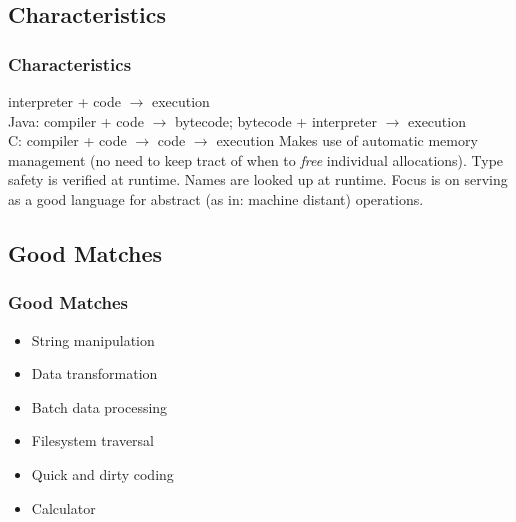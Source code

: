 \subsection{Characteristics}
\begin{frame}
    \frametitle{Characteristics}
    \vspace{5mm}
    
    \begin{itemize}
       interpreter + code $\rightarrow$ execution \\
        Java: compiler + code $\rightarrow$ bytecode; bytecode + interpreter $\rightarrow$ execution \\
        C: compiler + code $\rightarrow$ code $\rightarrow$ execution
       Makes use of automatic memory management (no need to keep tract of when to \textsl{free} individual allocations).
       Type safety is verified at runtime.
       Names are looked up at runtime.
       Focus is on serving as a good language for abstract (as in: machine distant) operations.
    \end{itemize}
\end{frame}

%    

\subsection{Good Matches}
\begin{frame}
    \frametitle{Good Matches}
    \vspace{5mm}
    
    \begin{itemize}
      \item String manipulation
      \item Data transformation
      \item Batch data processing
      \item Filesystem traversal
      \item Quick and dirty coding
      \item Calculator
    \end{itemize}
\end{frame}

